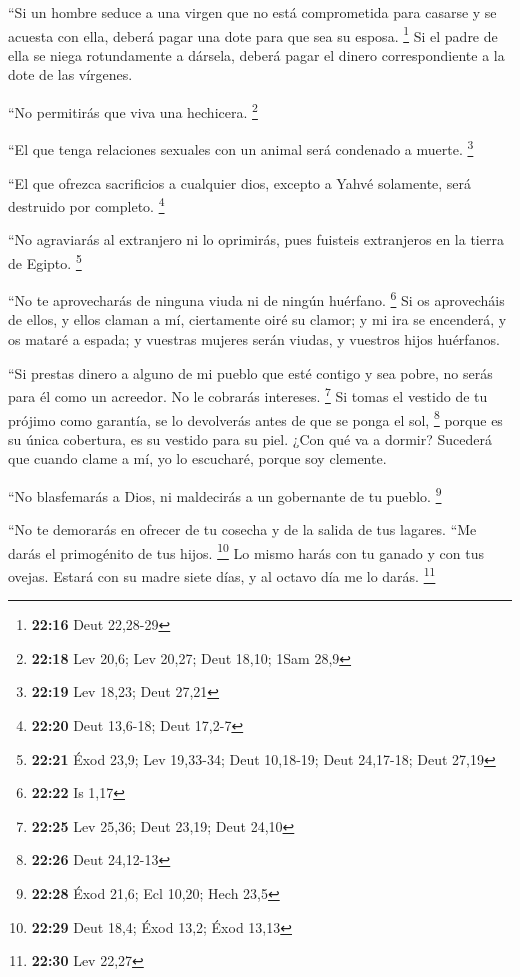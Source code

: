  ``Si un hombre seduce a una virgen que no está
comprometida para casarse y se acuesta con ella, deberá pagar una dote
para que sea su esposa. \footnote{\textbf{22:16} Deut 22,28-29}
 Si el padre de ella se niega rotundamente a dársela,
deberá pagar el dinero correspondiente a la dote de las vírgenes.

 ``No permitirás que viva una hechicera. \footnote{\textbf{22:18}
  Lev 20,6; Lev 20,27; Deut 18,10; 1Sam 28,9}

 ``El que tenga relaciones sexuales con un animal será
condenado a muerte. \footnote{\textbf{22:19} Lev 18,23; Deut 27,21}

 ``El que ofrezca sacrificios a cualquier dios, excepto a
Yahvé solamente, será destruido por completo. \footnote{\textbf{22:20}
  Deut 13,6-18; Deut 17,2-7}

 ``No agraviarás al extranjero ni lo oprimirás, pues
fuisteis extranjeros en la tierra de Egipto. \footnote{\textbf{22:21}
  Éxod 23,9; Lev 19,33-34; Deut 10,18-19; Deut 24,17-18; Deut 27,19}

 ``No te aprovecharás de ninguna viuda ni de ningún
huérfano. \footnote{\textbf{22:22} Is 1,17}  Si os
aprovecháis de ellos, y ellos claman a mí, ciertamente oiré su clamor;
 y mi ira se encenderá, y os mataré a espada; y vuestras
mujeres serán viudas, y vuestros hijos huérfanos.

 ``Si prestas dinero a alguno de mi pueblo que esté
contigo y sea pobre, no serás para él como un acreedor. No le cobrarás
intereses. \footnote{\textbf{22:25} Lev 25,36; Deut 23,19; Deut 24,10}
 Si tomas el vestido de tu prójimo como garantía, se lo
devolverás antes de que se ponga el sol, \footnote{\textbf{22:26} Deut
  24,12-13}  porque es su única cobertura, es su vestido
para su piel. ¿Con qué va a dormir? Sucederá que cuando clame a mí, yo
lo escucharé, porque soy clemente.

 ``No blasfemarás a Dios, ni maldecirás a un gobernante
de tu pueblo. \footnote{\textbf{22:28} Éxod 21,6; Ecl 10,20; Hech 23,5}

 ``No te demorarás en ofrecer de tu cosecha y de la
salida de tus lagares. ``Me darás el primogénito de tus hijos.
\footnote{\textbf{22:29} Deut 18,4; Éxod 13,2; Éxod 13,13}
 Lo mismo harás con tu ganado y con tus ovejas. Estará
con su madre siete días, y al octavo día me lo darás. \footnote{\textbf{22:30}
  Lev 22,27}

